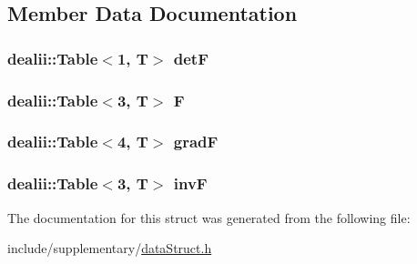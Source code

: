 \subsection{Member Data Documentation}
\subsubsection[{det\-F}]{\setlength{\rightskip}{0pt plus 5cm}dealii\-::\-Table$<$1, T$>$ det\-F}\label{structdeformation_mapwith_grad_aa1ff2dc8fb6f4f6e9125ca026505a977}
\subsubsection[{F}]{\setlength{\rightskip}{0pt plus 5cm}dealii\-::\-Table$<$3, T$>$ F}\label{structdeformation_mapwith_grad_a7934bed7ba72b5e4a3af1fd8a4e14198}
\subsubsection[{grad\-F}]{\setlength{\rightskip}{0pt plus 5cm}dealii\-::\-Table$<$4, T$>$ grad\-F}\label{structdeformation_mapwith_grad_a5bd7f05522c7d581d02e4de55682f5f2}
\subsubsection[{inv\-F}]{\setlength{\rightskip}{0pt plus 5cm}dealii\-::\-Table$<$3, T$>$ inv\-F}\label{structdeformation_mapwith_grad_ae40deb9e4616ec6d0b77519e56646ce0}


The documentation for this struct was generated from the following file\-:\begin{DoxyCompactItemize}
\item 
include/supplementary/\hyperlink{data_struct_8h}{data\-Struct.\-h}\end{DoxyCompactItemize}
